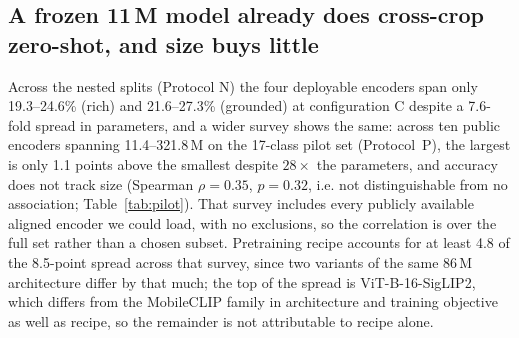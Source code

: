 \documentclass[a4paper,fleqn]{cas-dc}
\begin{document}
\subsection{A frozen 11\,M model already does cross-crop zero-shot, and size buys little}
\label{sec:flat}

Across the nested splits (Protocol N) the four deployable encoders span only 19.3--24.6\% (rich)
and 21.6--27.3\% (grounded) at configuration C despite a 7.6-fold spread in parameters, %
and a wider survey shows the same: across ten public encoders spanning 11.4--321.8\,M on the
17-class pilot set (Protocol~P), the largest is only 1.1 points above
the smallest despite $28\times$ the parameters, and accuracy does not track size (Spearman $\rho = 0.35$, $p = 0.32$, i.e. not
distinguishable from no association; Table~\ref{tab:pilot}). That survey includes every
publicly available aligned encoder we could load, with no exclusions, so the correlation is
over the full set rather than a chosen subset. Pretraining recipe accounts for at least 4.8 of the 8.5-point spread across that survey, since two variants of the same 86\,M architecture differ by that much; the top of the spread is ViT-B-16-SigLIP2, which differs from the MobileCLIP family in architecture and training objective as well as recipe, so the remainder is not attributable to recipe alone.
\end{document}
